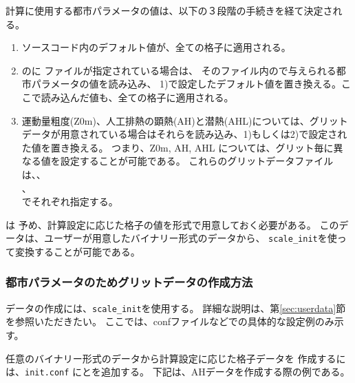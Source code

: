 計算に使用する都市パラメータの値は、以下の３段階の手続きを経て決定される。
\begin{enumerate}[1)]
\item ソースコード内のデフォルト値が、全ての格子に適用される。
\item {}のに
ファイルが指定されている場合は、
そのファイル内ので与えられる都市パラメータの値を読み込み、
1)で設定したデフォルト値を置き換える。ここで読み込んだ値も、全ての格子に適用される。
\item 運動量粗度(Z0m)、人工排熱の顕熱(AH)と潜熱(AHL)については、グリットデータが用意されている場合はそれらを読み込み、1)もしくは2)で設定された値を置き換える。
つまり、Z0m, AH, AHL については、グリット毎に異なる値を設定することが可能である。
これらのグリットデータファイルは、、\\
、\\
でそれぞれ指定する。
\end{enumerate}


 は
予め、計算設定に応じた格子の値を\scalenetcdf 形式で用意しておく必要がある。
このデータは、ユーザーが用意したバイナリー形式のデータから、
\verb|scale_init|を使って変換することが可能である。


\subsubsection{都市パラメータのためグリットデータの作成方法}

データの作成には、\verb|scale_init|を使用する。
詳細な説明は、第\ref{sec:userdata}節を参照いただきたい。
ここでは、confファイルなどでの具体的な設定例のみ示す。

任意のバイナリー形式のデータから計算設定に応じた格子データを
作成するには、\verb|init.conf| にとを追加する。
下記は、AHデータを作成する際の例である。


